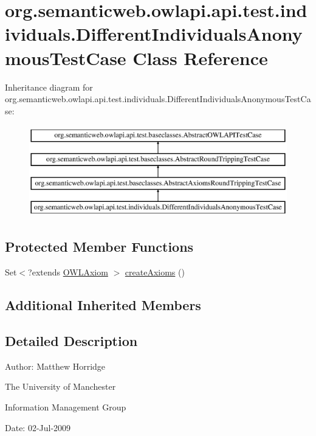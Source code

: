 \hypertarget{classorg_1_1semanticweb_1_1owlapi_1_1api_1_1test_1_1individuals_1_1_different_individuals_anonymous_test_case}{\section{org.\-semanticweb.\-owlapi.\-api.\-test.\-individuals.\-Different\-Individuals\-Anonymous\-Test\-Case Class Reference}
\label{classorg_1_1semanticweb_1_1owlapi_1_1api_1_1test_1_1individuals_1_1_different_individuals_anonymous_test_case}
}
Inheritance diagram for org.\-semanticweb.\-owlapi.\-api.\-test.\-individuals.\-Different\-Individuals\-Anonymous\-Test\-Case\-:\begin{figure}[H]
\begin{center}
\leavevmode
\includegraphics[height=4.000000cm]{classorg_1_1semanticweb_1_1owlapi_1_1api_1_1test_1_1individuals_1_1_different_individuals_anonymous_test_case}
\end{center}
\end{figure}
\subsection*{Protected Member Functions}
\begin{DoxyCompactItemize}
\item 
Set$<$?extends \hyperlink{interfaceorg_1_1semanticweb_1_1owlapi_1_1model_1_1_o_w_l_axiom}{O\-W\-L\-Axiom} $>$ \hyperlink{classorg_1_1semanticweb_1_1owlapi_1_1api_1_1test_1_1individuals_1_1_different_individuals_anonymous_test_case_aacec2765d6a5d3f7acfeb583e482a004}{create\-Axioms} ()
\end{DoxyCompactItemize}
\subsection*{Additional Inherited Members}


\subsection{Detailed Description}
Author\-: Matthew Horridge\par
 The University of Manchester\par
 Information Management Group\par
 Date\-: 02-\/\-Jul-\/2009 

